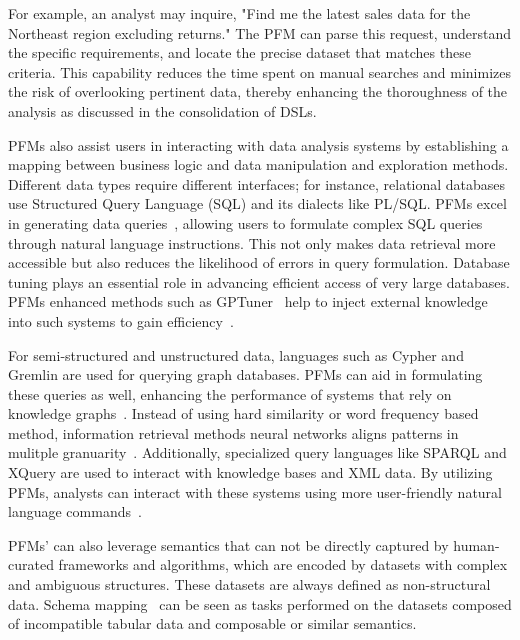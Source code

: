   For example, an analyst may inquire, "Find me the latest sales data for the Northeast region excluding returns." The PFM can parse this request, understand the specific requirements, and locate the precise dataset that matches these criteria. This capability reduces the time spent on manual searches and minimizes the risk of overlooking pertinent data, thereby enhancing the thoroughness of the analysis as discussed in the consolidation of DSLs.
  
  PFMs also assist users in interacting with data analysis systems by establishing a mapping between business logic and data manipulation and exploration methods. Different data types require different interfaces; for instance, relational databases use Structured Query Language (SQL) and its dialects like PL/SQL. PFMs excel in generating data queries~\cite{li2023resdsql, gu2023few, cheng2022binding,smalllargemodelNL2SQL,text2sqlevaluation,readyforNL2SQL,CatSQL}, allowing users to formulate complex SQL queries through natural language instructions. This not only makes data retrieval more accessible but also reduces the likelihood of errors in query formulation. Database tuning plays an essential role in advancing efficient access of very large databases. PFMs enhanced methods such as GPTuner~\cite{GPTuner} help to inject external knowledge into such systems to gain efficiency~\cite{NLPTune}.
  
  For semi-structured and unstructured data, languages such as Cypher and Gremlin are used for querying graph databases. PFMs can aid in formulating these queries as well, enhancing the performance of systems that rely on knowledge graphs~\cite{huang2023kosa}. Instead of using hard similarity or word frequency based method, information retrieval methods neural networks aligns patterns in mulitple granuarity~\cite{NeuralDB}. Additionally, specialized query languages like SPARQL and XQuery are used to interact with knowledge bases and XML data. By utilizing PFMs, analysts can interact with these systems using more user-friendly natural language commands~\cite{li2024flexkbqa, Lehmann2023LanguageMA,ReActTable}. 

  PFMs' can also leverage semantics that can not be directly captured by human-curated frameworks and algorithms, which are encoded by datasets with complex and ambiguous structures. These datasets are always defined as non-structural data. Schema mapping~\cite{LLMschema} can be seen as tasks performed on the datasets composed of incompatible tabular data and composable or similar semantics.
  
